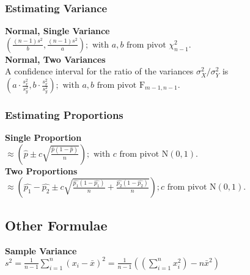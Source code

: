 \documentclass{article}
\begin{document}
\begin{multicols*}{2}
{\color{magenta}\subsubsection*{Estimating Variance}}
\textbf{Normal, Single Variance}\\
$ \left( \frac{(n-1) s^{2}}{b}, \frac{(n-1) s^{2}}{a} \right); \mbox{ with } a, b \mbox{ from pivot } \chi^{2}_{n-1}.$\\
\textbf{Normal, Two Variances}\\
A confidence interval for the ratio of the variances $\sigma_{X}^{2} / \sigma_{Y}^{2}$ is
$ \left( a \cdot \frac{s_{x}^{2}}{s_{y}^{2}}, b \cdot \frac{s_{x}^{2}}{s_{y}^{2}} \right); \mbox{ with } a, b \mbox{ from pivot } \mbox{F}_{m-1,n-1}.$\\
\vfill

{\color{magenta}\subsubsection*{Estimating Proportions}}
\textbf{Single Proportion}\\
$ \approx \left( \hat{p} \pm c \sqrt{\frac{\hat{p} (1-\hat{p})}{n}} \right); \mbox{ with } c \mbox{ from pivot } \mbox{N}(0, 1).$\\
\textbf{Two Proportions}\\
$ \approx \left( \hat{p_{1}} - \hat{p_{2}} \pm c \sqrt{\frac{\hat{p_{1}} (1-\hat{p_{1}})}{n} + \frac{\hat{p_{2}} (1-\hat{p_{2}})}{n}} \right); c \mbox{ from pivot } \mbox{N}(0, 1).$\\

\subsection*{Other Formulae}
\textbf{Sample Variance}\\
$s^2 = \frac{1}{n-1} \sum_{i=1}^{n} (x_{i}-\bar{x})^2 = \frac{1}{n-1} \left( \left( \sum_{i=1}^{n} x_{i}^2 \right) -n \bar{x}^2 \right)$
\end{multicols*}
\end{document}

